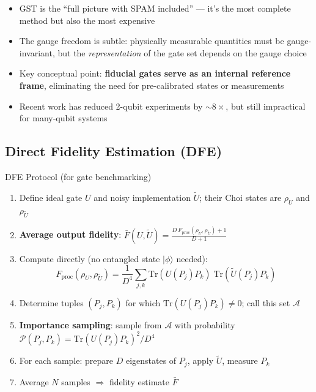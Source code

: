 \documentclass[10pt,a4paper]{article}
\begin{document}
\begin{insightbox}
\begin{itemize}
  \item GST is the ``full picture with SPAM included'' --- it's the most complete method but also the most expensive
  \item The gauge freedom is subtle: physically measurable quantities must be gauge-invariant, but the \emph{representation} of the gate set depends on the gauge choice
  \item Key conceptual point: \textbf{fiducial gates serve as an internal reference frame}, eliminating the need for pre-calibrated states or measurements
  \item Recent work has reduced 2-qubit experiments by $\sim 8\times$, but still impractical for many-qubit systems
\end{itemize}
\end{insightbox}

\newpage

\subsection{Direct Fidelity Estimation (DFE)}

\begin{algorithmbox}{DFE Protocol (for gate benchmarking)}
\begin{enumerate}
  \item Define ideal gate $U$ and noisy implementation $\tilde{U}$; their Choi states are $\rho_U$ and $\rho_{\tilde{U}}$
  \item \textbf{Average output fidelity}: $\bar{F}(U, \tilde{U}) = \frac{D\,F_{\mathrm{proc}}(\rho_U, \rho_{\tilde{U}}) + 1}{D + 1}$
  \item Compute directly (no entangled state $|\phi\rangle$ needed):
  \[
    F_{\mathrm{proc}}(\rho_U, \rho_{\tilde{U}}) = \frac{1}{D^4}\sum_{j,k} \mathrm{Tr}(U(P_j)P_k)\;\mathrm{Tr}(\tilde{U}(P_j)P_k)
  \]
  \item Determine tuples $(P_j, P_k)$ for which $\mathrm{Tr}(U(P_j)P_k) \neq 0$; call this set $\mathcal{A}$
  \item \textbf{Importance sampling}: sample from $\mathcal{A}$ with probability $\mathcal{P}(P_j, P_k) = \mathrm{Tr}(U(P_j)P_k)^2/D^4$
  \item For each sample: prepare $D$ eigenstates of $P_j$, apply $\tilde{U}$, measure $P_k$
  \item Average $N$ samples $\Rightarrow$ fidelity estimate $\bar{F}$
\end{enumerate}
\end{algorithmbox}
\end{document}
